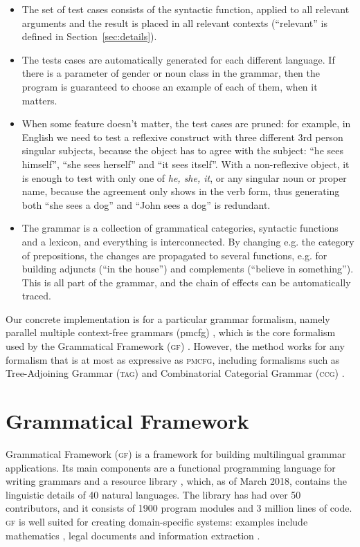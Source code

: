 \documentclass[11pt]{article}
\def\gf{\textsc{gf}}
\def\ccg{\textsc{ccg}}
\def\tag{\textsc{tag}}
\def\pmcfg{\textsc{pmcfg}}
\begin{document}
\begin{itemize}
\item The set of test cases consists of the syntactic function, applied
  to all relevant arguments and the result is placed in all relevant
  contexts (``relevant'' is defined in
  Section~\ref{sec:details}).
\item The tests cases are automatically generated for each different
  language. If there is a parameter of gender or noun class in the
  grammar, then the program is guaranteed to choose an example of each
  of them, when it matters.
\item When some feature doesn't matter, the test cases are pruned: for
  example, in English we need to test a reflexive construct with three
  different 3rd person singular subjects, because the object has to
  agree with the subject: ``he sees himself'', ``she sees herself''
  and ``it sees itself''. With a non-reflexive object, it is
  enough to test with only one of \emph{he, she, it}, or any singular
  noun or proper name, because the agreement only shows in the verb
  form, thus generating both ``she sees a dog'' and ``John sees a
  dog'' is redundant.
\item The grammar is a collection of grammatical categories, syntactic
  functions and a lexicon, and everything is interconnected. By
  changing e.g. the category of prepositions, the changes are
  propagated to several functions, e.g. for building adjuncts (``in
  the house'') and complements (``believe in something''). This is
  all part of the grammar, and the chain of effects can be
  automatically traced. 
\end{itemize}

Our concrete implementation is for a particular grammar formalism, namely parallel multiple context-free grammars ({\sc pmcfg}) \cite{seki91pmcfg}, which is the core formalism used by the Grammatical Framework (\gf) \cite{ranta2004gf}. However, the method works for any formalism that is at most as expressive as \pmcfg{}, including formalisms such as Tree-Adjoining Grammar (\tag) \cite{joshi1975tag} and Combinatorial Categorial Grammar (\ccg) \cite{steedman1988ccg}.

\section{Grammatical Framework} \label{sec:gf}
Grammatical Framework (\gf) \cite{ranta2004gf} 
is a framework for building multilingual grammar applications. Its main
components are a functional programming language for writing grammars
and a resource library \cite{ranta2009rgl}, which, as of March 2018,
contains the linguistic details of 40 natural languages. The library
has had over 50 contributors, and it consists of 1900 program modules and 3
million lines of code. \gf{} is well suited for creating
domain-specific systems: examples include mathematics
\cite{caprotti2006webalt}, legal documents \cite{camilleri2017} and
information extraction \cite{Safwat-EtAl:2015:iiWAS}.
\end{document}
